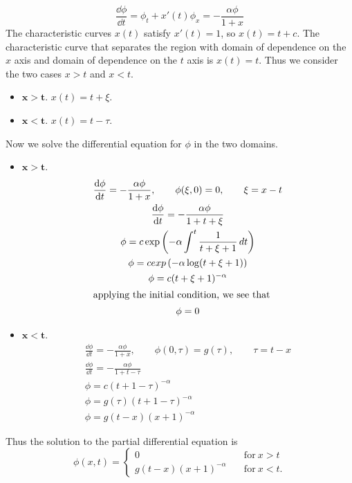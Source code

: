 \begin{Solution}
  \[ \frac{\dd \phi}{\dd t} = \phi_t + x'(t) \phi_x = - \frac{\alpha \phi}{1+x} \]
  The characteristic curves $x(t)$ satisfy $x'(t) = 1$, so $x(t) = t + c$.
  The characteristic curve that separates the region with domain of 
  dependence on the $x$ axis and domain of dependence on  the $t$ axis is
  $x(t) = t$.  Thus we consider the two cases $x > t$ and $x < t$.
  \begin{itemize}
  \item $\mathbf{x > t}$.  $x(t) = t + \xi$.
  \item $\mathbf{x < t}$.  $x(t) = t - \tau$.
  \end{itemize}

  Now we solve the differential equation for $\phi$ in the two domains.
  \begin{itemize}
  \item $\mathbf{x > t}$.  
    \begin{gather*}
      \frac{\mathrm{d} \phi}{\mathrm{d} t} = -\frac{\alpha \phi}{1+x}, \qquad \phi(\xi,0)=0, \qquad
      \xi = x-t \\
      \frac{\mathrm{d} \phi}{\mathrm{d} t} = -\frac{\alpha \phi}{1+t+\xi} \\
      \phi = c \exp\left(-\alpha \int^t \frac{1}{t+\xi+1} \,d t \right) \\
      \phi = c exp\left(-\alpha \log(t+\xi+1) \right) \\
      \phi = c (t+\xi+1)^{-\alpha} \\
      \intertext{applying the initial condition, we see that}
      \phi = 0
    \end{gather*}
  \item $\mathbf{x < t}$.
    \begin{gather*}
      \frac{\dd \phi}{\dd t} = -\frac{\alpha \phi}{1+x}, \qquad \phi(0,\tau) = g(\tau),
      \qquad \tau = t-x \\
      \frac{\dd \phi}{\dd t} = - \frac{\alpha \phi}{1+t-\tau} \\
      \phi = c (t+1-\tau)^{-\alpha} \\
      \phi = g(\tau) (t+1-\tau)^{-\alpha} \\
      \phi = g(t-x) (x+1)^{-\alpha}
    \end{gather*}
  \end{itemize}
  Thus the solution to the partial differential equation is
  \[ \boxed{ \phi(x,t) = 
    \begin{cases}
      0 \quad &\mathrm{for}\ x > t \\
      g(t-x) (x+1)^{-\alpha} \quad &\mathrm{for}\ x < t.
    \end{cases}
    } \]
\end{Solution}



